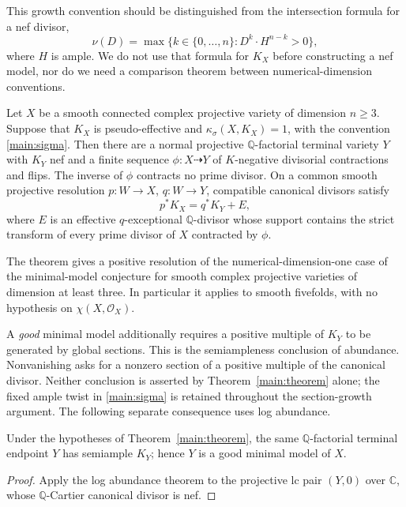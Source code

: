 This growth convention should be distinguished from the intersection
formula for a nef divisor,
\[
\nu(D)=\max\{k\in\{0,\ldots,n\}:D^k\cdot H^{n-k}>0\},
\]
where \(H\) is ample. We do not use that formula for \(K_X\) before
constructing a nef model, nor do we need a comparison theorem between
numerical-dimension conventions.

\begin{samepage}
\begin{theorem}\label{main:theorem}
Let \(X\) be a smooth connected complex projective variety of dimension
\(n\geq3\). Suppose that \(K_X\) is pseudo-effective and
\(\kappa_\sigma(X,K_X)=1\), with the convention
\eqref{main:sigma}. Then there are a normal projective
\(\mathbb Q\)-factorial terminal variety \(Y\) with \(K_Y\) nef and
a finite sequence
\(\phi:X\dashrightarrow Y\) of \(K\)-negative divisorial contractions
and flips. The inverse of \(\phi\) contracts no prime divisor. On a
common smooth projective resolution \(p:W\to X\), \(q:W\to Y\),
compatible canonical divisors satisfy
\begin{equation}\label{main:comparison}
p^*K_X=q^*K_Y+E,
\end{equation}
where \(E\) is an effective \(q\)-exceptional \(\mathbb Q\)-divisor
whose support contains the strict transform of every prime divisor of
\(X\) contracted by \(\phi\).
\end{theorem}
\end{samepage}

The theorem gives a positive resolution of the numerical-dimension-one
case of the minimal-model conjecture for smooth complex projective varieties
of dimension at least three. In particular it applies to smooth fivefolds,
with no hypothesis on \(\chi(X,\mathcal O_X)\).

A \emph{good} minimal model additionally requires a positive multiple of
\(K_Y\) to be generated by global sections. This is the semiampleness
conclusion of abundance. Nonvanishing asks for a nonzero section of a
positive multiple of the canonical divisor. Neither conclusion is asserted by
Theorem~\ref{main:theorem} alone; the fixed ample twist in
\eqref{main:sigma} is retained throughout the section-growth argument.
The following separate consequence uses log abundance.

\begin{corollary}\label{cor:good-model}
Under the hypotheses of Theorem~\ref{main:theorem}, the same
\(\mathbb Q\)-factorial terminal endpoint \(Y\) has semiample \(K_Y\);
hence \(Y\) is a good minimal model of \(X\).
\end{corollary}
\begin{proof}
Apply the log abundance theorem \cite[Theorem~1.1]{OpenAILogAbundance2026}
to the projective lc pair \((Y,0)\) over \(\mathbb C\), whose
\(\mathbb Q\)-Cartier canonical divisor is nef.
\end{proof}

